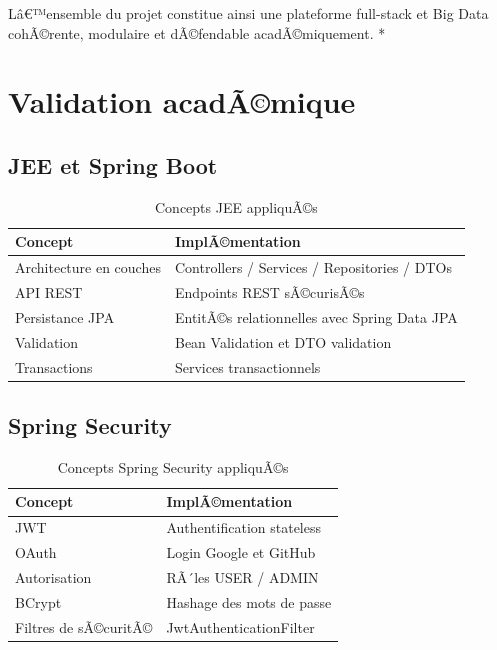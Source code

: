 ﻿\documentclass[12pt,a4paper]{report}
\begin{document}
Lâ€™ensemble du projet constitue ainsi une plateforme full-stack et Big Data cohÃ©rente, modulaire et dÃ©fendable acadÃ©miquement.
*

\chapter{Validation acadÃ©mique}

\section{JEE et Spring Boot}

\begin{table}[H]
\centering
\caption{Concepts JEE appliquÃ©s}
\begin{tabular}{|p{5cm}|p{8cm}|}
\hline
\textbf{Concept} & \textbf{ImplÃ©mentation} \\
\hline
Architecture en couches & Controllers / Services / Repositories / DTOs \\
\hline
API REST & Endpoints REST sÃ©curisÃ©s \\
\hline
Persistance JPA & EntitÃ©s relationnelles avec Spring Data JPA \\
\hline
Validation & Bean Validation et DTO validation \\
\hline
Transactions & Services transactionnels \\
\hline
\end{tabular}
\end{table}

\section{Spring Security}

\begin{table}[H]
\centering
\caption{Concepts Spring Security appliquÃ©s}
\begin{tabular}{|p{5cm}|p{8cm}|}
\hline
\textbf{Concept} & \textbf{ImplÃ©mentation} \\
\hline
JWT & Authentification stateless \\
\hline
OAuth & Login Google et GitHub \\
\hline
Autorisation & RÃ´les USER / ADMIN \\
\hline
BCrypt & Hashage des mots de passe \\
\hline
Filtres de sÃ©curitÃ© & JwtAuthenticationFilter \\
\hline
\end{tabular}
\end{table}
\end{document}
